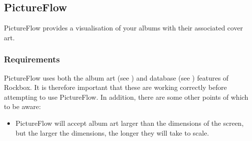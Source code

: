 \subsection{PictureFlow}
PictureFlow provides a visualisation of your albums with their associated cover
art. 


\subsubsection{Requirements}
PictureFlow uses both the album art (see ) and 
database (see ) features of Rockbox.
It is therefore important that these are working correctly before attempting
to use PictureFlow. In addition, there are some other points of which to be
aware:

  \begin{itemize}
    \item PictureFlow will accept album art larger than the dimensions of the
    screen, but the larger the dimensions, the longer they will take to scale.
  \end{itemize}

